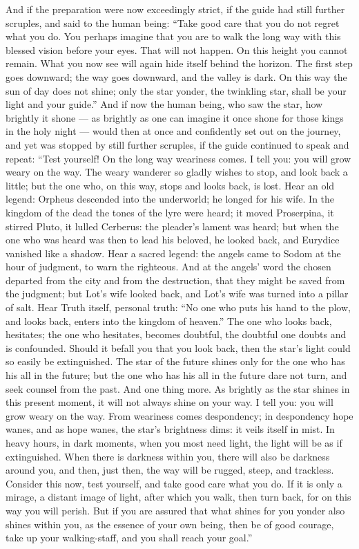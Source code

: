 \documentclass[12pt,a4paper]{book}
\begin{document}
And if the preparation were now exceedingly strict, if the guide had still further scruples, and said to the human being: ``Take good care that you do not regret what you do. You perhaps imagine that you are to walk the long way with this blessed vision before your eyes. That will not happen. On this height you cannot remain. What you now see will again hide itself behind the horizon. The first step goes downward; the way goes downward, and the valley is dark. On this way the sun of day does not shine; only the star yonder, the twinkling star, shall be your light and your guide.'' And if now the human being, who saw the star, how brightly it shone --- as brightly as one can imagine it once shone for those kings in the holy night --- would then at once and confidently set out on the journey, and yet was stopped by still further scruples, if the guide continued to speak and repeat: ``Test yourself! On the long way weariness comes. I tell you: you will grow weary on the way. The weary wanderer so gladly wishes to stop, and look back a little; but the one who, on this way, stops and looks back, is lost. Hear an old legend: Orpheus descended into the underworld; he longed for his wife. In the kingdom of the dead the tones of the lyre were heard; it moved Proserpina, it stirred Pluto, it lulled Cerberus: the pleader's lament was heard; but when the one who was heard was then to lead his beloved, he looked back, and Eurydice vanished like a shadow. Hear a sacred legend: the angels came to Sodom at the hour of judgment, to warn the righteous. And at the angels' word the chosen departed from the city and from the destruction, that they might be saved from the judgment; but Lot's wife looked back, and Lot's wife was turned into a pillar of salt. Hear Truth itself, personal truth: ``No one who puts his hand to the plow, and looks back, enters into the kingdom of heaven.'' The one who looks back, hesitates; the one who
hesitates, becomes doubtful, the doubtful one doubts and is confounded. Should it befall you that you look back, then the star's light could so easily be extinguished. The star of the future shines only for the one who has his all in the future; but the one who has his all in the future dare not turn, and seek counsel from the past. And one thing more. As brightly as the star shines in this present moment, it will not always shine on your way. I tell you: you will grow weary on the way. From weariness comes despondency; in despondency hope wanes, and as hope wanes, the star's brightness dims: it veils itself in mist. In heavy hours, in dark moments, when you most need light, the light will be as if extinguished. When there is darkness within you, there will also be darkness around you, and then, just then, the way will be rugged, steep, and trackless. Consider this now, test yourself, and take good care what you do. If it is only a mirage, a distant image of light, after which you walk, then turn back, for on this way you will perish. But if you are assured that what shines for you yonder also shines within you, as the essence of your own being, then be of good courage, take up your walking-staff, and you shall reach your goal.''
\end{document}
